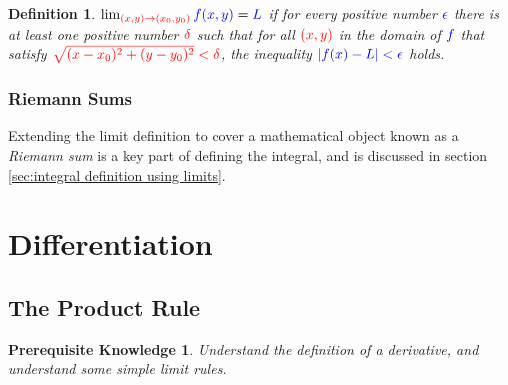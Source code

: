 \documentclass{myarticle}
\newcommand{\hor}[1]{\textcolor{red}{#1}} %
\newcommand{\ver}[1]{\textcolor{blue}{#1}}
\theoremstyle{nospace}
\newtheorem*{oldprereq}{Prerequisite Knowledge}
\newenvironment{prereq}{\begin{mdframed}\begin{oldprereq}}{\end{oldprereq}\end{mdframed}}
\newtheorem*{oldattempt}{Definition}
\newenvironment{attempt}{\begin{mdframed}\begin{oldattempt}}{\end{oldattempt}\end{mdframed}}
\newtheorem{old series theorem}{Theorem}
\newenvironment{series theorem}{\begin{mdframed}\begin{old series theorem}}{\end{old series theorem}\end{mdframed}}
\begin{document}
\begin{attempt} $\lim_{\hor{(x, y) \to (x_0, y_0)}} \ver{f(x, y)} = \ver{L}$ if for every positive number $\ver{\epsilon}$ there is at least one positive number $\hor{\delta}$ such that for all $\hor{(x, y)}$ in the domain of $\ver{f}$ that satisfy $\hor{\sqrt{(x - x_0)^2 + (y - y_0)^2} < \delta}$, the inequality $\ver{|f(x) - L| < \epsilon}$ holds. \end{attempt}

\subsubsection{Riemann Sums} \label{sec:limits of riemann sums}

Extending the limit definition to cover a mathematical object known as a \emph{Riemann sum} is a key part of defining the integral, and is discussed in section \ref{sec:integral definition using limits}.

\section{Differentiation} \label{sec:differentiation}

\subsection{The Product Rule} \label{sec:product rule}
\begin{prereq} Understand the definition of a derivative, and understand some simple limit rules. \end{prereq}
\end{document}
